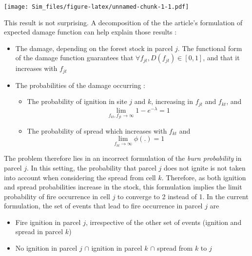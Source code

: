 \documentclass[
]{article}
\begin{document}
\texttt{[image: Sim\_files/figure-latex/unnamed-chunk-1-1.pdf]}

This result is not surprising. A decomposition of the the article's
formulation of expected damage function can help explain those results :

\begin{itemize}
    \item The damage, depending on the forest stock in parcel $j$. The functional form of the damage function guarantees that $\forall f_{jt}, D(f_{jt}) \in  [0,1]$, and that it increases with $f_{jt}$
    \item The probabilities of the damage occurring : 
    \begin{itemize}
        \item The probability of ignition in site $j$ and $k$, increasing in $f_{jt}$ and $f_{kt}$, and $$\lim_{f_{kt},f_{jt}\to \infty}1-e^{-\lambda}=1$$
        \item The probability of spread which increases with $f_{kt}$ and 
        $$
        \lim_{f_{kt}\to \infty}\phi(.)=1
        $$
    \end{itemize}
\end{itemize}

The problem therefore lies in an incorrect formulation of the
\textit{burn probability} in parcel \(j\). In this setting, the
probability that parcel \(j\) does not ignite is not taken into account
when considering the spread from cell \(k\). Therefore, as both ignition
and spread probabilities increase in the stock, this formulation implies
the limit probability of fire occurrence in cell \(j\) to converge to 2
instead of 1. In the current formulation, the set of events that lead to
fire occurrence in parcel \(j\) are

\begin{itemize}
    \item Fire ignition in parcel $j$, irrespective of the other set of events (ignition and spread in parcel $k$)
    \item No ignition in parcel $j$ $\cap$ ignition in parcel $k$ $\cap$ spread from $k$ to $j$
\end{itemize}
\end{document}
